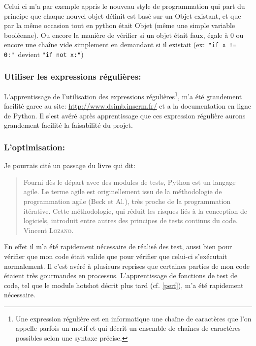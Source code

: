 Celui ci m'a par exemple appris le nouveau style de programmation qui part du principe que chaque nouvel objet définit est basé sur un Objet existant, et que par la même occasion tout en python était Objet (même une simple variable booléenne). Ou encore la manière de vérifier si un objet était faux, égale à 0 ou encore une chaîne vide simplement en demandant si il existait (ex:~\texttt{"if x != 0:"}~devient \texttt{"if not x:"})

        \subsubsection{Utiliser les expressions régulières:} 
L'apprentissage de l'utilisation des expressions régulières\footnote{Une expression régulière est en informatique une chaîne de caractères que l’on appelle parfois un motif et qui décrit un ensemble de chaînes de caractères possibles selon une syntaxe précise.}, m'a été grandement facilité garce au site: \url{http://www.dsimb.inserm.fr/}\cite{re} et a la documentation en ligne de Python\cite{pydoc}. Il s'est avéré après apprentissage que ces expression régulière aurons grandement facilité la faisabilité du projet.

        \subsubsection{L'optimisation:}
Je pourrais cité un passage du livre\cite{pybook} qui dit:
\begin{quotation}
    Fourni dès le départ avec des modules de tests, Python est un langage agile. Le terme agile est originellement issu de la méthodologie de programmation agile (Beck et Al.), très proche de la programmation itérative. Cette méthodologie, qui réduit les risques liés à la conception de logiciels, introduit entre autres des principes de tests continus du code.
    \raggedleft Vincent \textsc{Lozano}.
\end{quotation}

En effet il m'a été rapidement nécessaire de réalisé des test, aussi bien pour vérifier que mon code était valide que pour vérifier que celui-ci s’exécutait normalement. Il c'est avéré à plusieurs reprises que certaines parties de mon code étaient très gourmandes en processus. L’apprentissage de fonctions de test de code, tel que le module hotshot décrit plus tard (cf. \vref{perf}), m'a été rapidement nécessaire.

